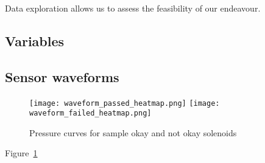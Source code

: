 Data exploration allows us to assess the feasibility of our endeavour.

\subsection{Variables}

\subsection{Sensor waveforms}

\begin{figure}
  \texttt{[image: waveform\_passed\_heatmap.png]}
  \texttt{[image: waveform\_failed\_heatmap.png]}
  \caption{Pressure curves for sample okay and not okay solenoids}
  \label{fig:waveform-heatmaps}
\end{figure}

Figure~\ref{fig:waveform-heatmaps}
